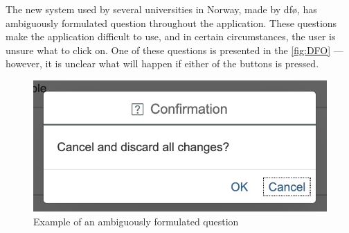 The new system used by several universities in Norway, made by \gls{dfø}, has ambiguously formulated question throughout the application. These questions make the application difficult to use, and in certain circumstances, the user is unsure what to click on. One of these questions is presented in the \autoref{fig:DFO} --- however, it is unclear what will happen if either of the buttons is pressed.

\begin{figure}[h]
    \centering
    \includegraphics[scale=0.55, frame]{figures/DFO.jpg}
    \caption{Example of an ambiguously formulated question}
    \label{fig:DFO}
\end{figure}


